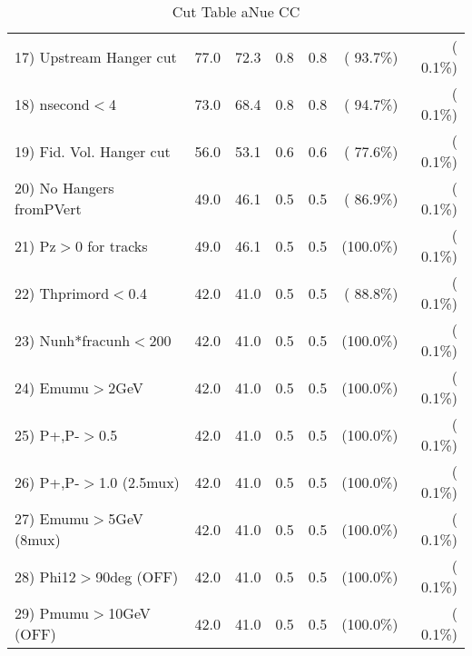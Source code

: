 \begin{table}[h!]
\begin{tabular}{||l||r|r|r|r|r|r||}
 17) Upstream Hanger cut  &         77.0 &         72.3 &          0.8 &          0.8 & ( 93.7\%) & (  0.1\%) \\
 18) nsecond$<$4          &         73.0 &         68.4 &          0.8 &          0.8 & ( 94.7\%) & (  0.1\%) \\
 19) Fid. Vol. Hanger cut &         56.0 &         53.1 &          0.6 &          0.6 & ( 77.6\%) & (  0.1\%) \\
 20) No Hangers fromPVert &         49.0 &         46.1 &          0.5 &          0.5 & ( 86.9\%) & (  0.1\%) \\
 21) Pz$>$0 for tracks    &         49.0 &         46.1 &          0.5 &          0.5 & (100.0\%) & (  0.1\%) \\
 22) Thprimord$<$0.4      &         42.0 &         41.0 &          0.5 &          0.5 & ( 88.8\%) & (  0.1\%) \\
 23) Nunh*fracunh$<$200   &         42.0 &         41.0 &          0.5 &          0.5 & (100.0\%) & (  0.1\%) \\
 24) Emumu$>$2GeV         &         42.0 &         41.0 &          0.5 &          0.5 & (100.0\%) & (  0.1\%) \\
 25) P+,P-$>$0.5          &         42.0 &         41.0 &          0.5 &          0.5 & (100.0\%) & (  0.1\%) \\
 26) P+,P-$>$1.0 (2.5mux) &         42.0 &         41.0 &          0.5 &          0.5 & (100.0\%) & (  0.1\%) \\
 27) Emumu$>$5GeV  (8mux) &         42.0 &         41.0 &          0.5 &          0.5 & (100.0\%) & (  0.1\%) \\
 28) Phi12$>$90deg  (OFF) &         42.0 &         41.0 &          0.5 &          0.5 & (100.0\%) & (  0.1\%) \\
 29) Pmumu$>$10GeV  (OFF) &         42.0 &         41.0 &          0.5 &          0.5 & (100.0\%) & (  0.1\%) \\
 \hline
 \hline
 \end{tabular}
 \caption{Cut Table  aNue CC  }
 \label{tab-cutcohjpsi-mumu_anuecc}
 \end{table}
